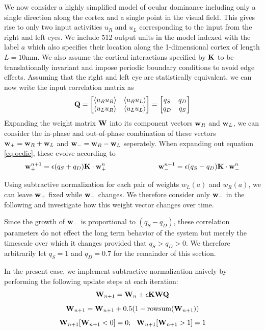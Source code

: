 \documentclass{article}
\begin{document}
We now consider a highly simplified model of ocular dominance including only a single direction along the cortex and a single point in the visual field. This gives rise to only two input activities $u_R$ and $u_L$ corresponding to the input from the right and left eyes. We include 512 output units in the model indexed with the label $a$ which also specifies their location along the 1-dimensional cortex of length $L = 10$mm.
We also assume the cortical interactions specified by $\bf K$ to be translationally invariant and impose periodic boundary conditions to avoid edge effects.
Assuming that the right and left eye are statistically equivalent, we can now write the input correlation matrix as
\[
{\bf Q} = 
\begin{bmatrix}
   \braket{u_R u_R} & \braket{u_R u_L} \\
   \braket{u_L u_R} & \braket{u_L u_L}  \\
\end{bmatrix}
=
\begin{bmatrix}
   q_S &q_D \\
   q_D & q_S  \\
\end{bmatrix}
\]
Expanding the weight matrix $\bf W$ into its component vectors ${\bf w}_R$ and ${\bf w}_L$, we can consider the in-phase and out-of-phase combination of these vectors ${\bf w}_+ = {\bf w}_R + {\bf w}_L $ and ${\bf w}_- = {\bf w}_R - {\bf w}_L $ seperately. When expanding out equation \ref{eq:ocdic}, these evolve according to
\begin{equation}
{\bf w}_{+}^{n+1} = \epsilon (q_S+q_D){\bf K \cdot w}_+^n
~~~~~~~~~~~~~~~~~~~~~~
{\bf w}_{-}^{n+1} = \epsilon (q_S-q_D){\bf K \cdot w}_-^n
\end{equation}

Using subtractive normalization for each pair of weights $w_L(a)$ and $w_R(a)$, we can leave ${\bf w}_+$ fixed while ${\bf w}_-$ changes. We therefore consider only ${\bf w}_-$ in the following and investigate how this weight vector changes over time.

Since the growth of ${\bf w}_-$ is proportional to $(q_S-q_D)$, these correlation parameters do not effect the long term behavior of the system but merely the timescale over which it changes provided that $q_S > q_D > 0$. We therefore arbitrarily let $q_S = 1$ and $q_D = 0.7$ for the remainder of this section. 

In the present case, we implement subtractive normalization naively by performing the following update steps at each iteration:
\begin{equation}\label{eq:ocdic2}
{\bf W}_{n+1} = {\bf W}_n + \epsilon \bf K W Q
\end{equation}
\begin{equation}
{\bf W}_{n+1} = {\bf W}_{n+1} + 0.5 (1 - \text{rowsum}({\bf W}_{n+1}))
\end{equation}
\begin{equation}\label{eq:subnorm}
{\bf W}_{n+1}[ {\bf W}_{n+1} < 0 ] = 0
;~~
{\bf W}_{n+1}[ {\bf W}_{n+1} > 1 ] = 1
\end{equation}
\end{document}
